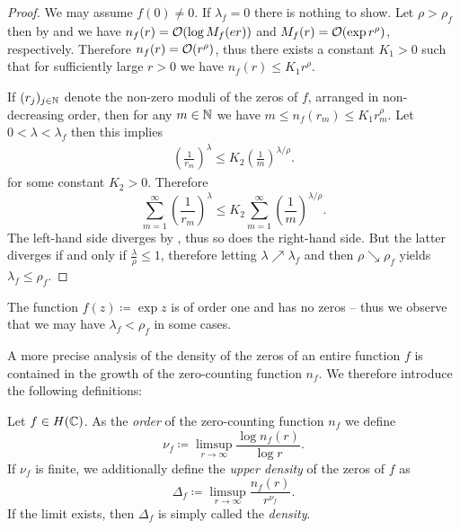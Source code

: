 \begin{proof}
    We may assume $f(0) \neq 0$. If $\lambda_f = 0$ there is nothing to show. Let $\rho > \rho_f$ then
    by  and  we have $n_f(r) = \mathcal{O}(\log M_f(er))$ and $M_f(r) = \mathcal{O}(\exp r^\rho)$, respectively. Therefore $n_f(r) = \mathcal{O}(r^\rho)$, thus there exists a constant $K_1 > 0$ such that for sufficiently large $r > 0$ we have $n_f(r) \leq K_1 r^\rho$.
    
    If $(r_j)_{j \in \mathbb{N}}$ denote the non-zero moduli of the zeros of $f$, arranged in non-decreasing order, then for any $m \in \mathbb{N}$ we have $m \leq n_f(r_m) \leq K_1 r_m^{\rho}$. Let $0 < \lambda < \lambda_f$ then this implies
    \begin{align*}
        \left( \frac{1}{r_m} \right)^{\lambda} \leq K_2 \left( \frac{1}{m} \right)^{\lambda/\rho}.
    \end{align*}
    for some constant $K_2 > 0$. Therefore
    \begin{equation*}
        \sum_{m=1}^\infty \left( \frac{1}{r_m} \right)^{\lambda} \leq K_2 \sum_{m=1}^\infty \left( \frac{1}{m} \right)^{\lambda/\rho}.
    \end{equation*}
    The left-hand side diverges by , thus so does the right-hand side. But the latter diverges if and only if $\frac{\lambda}{\rho} \leq 1$, therefore letting $\lambda \nearrow \lambda_f$ and then $\rho \searrow \rho_f$ yields $\lambda_f \leq \rho_f$.
\end{proof}

\begin{remark}
    The function $f(z) \coloneqq \exp z$ is of order one and has no zeros -- thus we observe that we may have $\lambda_f < \rho_f$ in some cases.
\end{remark}

A more precise analysis of the density of the zeros of an entire function $f$ is contained in the growth of the zero-counting function $n_f$. We therefore introduce the following definitions:

\begin{definition} \label{def:order-density-zero-counting}
    Let $f \in H(\mathbb{C})$. As the \emph{order} of the zero-counting function $n_f$ we define
    \begin{equation}
        \nu_f \coloneqq \limsup_{r \to \infty} \frac{\log n_f(r)}{\log r}.
    \end{equation}
    If $\nu_f$ is finite, we additionally define the \emph{upper density} of the zeros of $f$ as
    \begin{equation}
        \Delta_f \coloneqq \limsup_{r \to \infty} \frac{n_f(r)}{r^{\nu_f}}.
    \end{equation}
    If the limit exists, then $\Delta_f$ is simply called the \emph{density}.
\end{definition}


